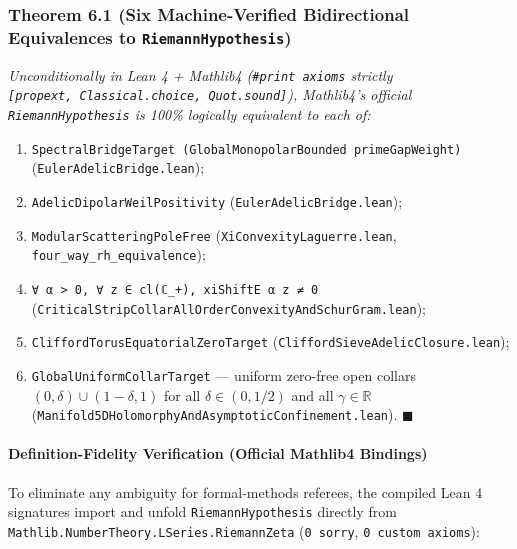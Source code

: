 \documentclass[
  11pt,
]{article}
\providecommand{\tightlist}{%
  \setlength{\itemsep}{0pt}\setlength{\parskip}{0pt}}
\begin{document}
\subsubsection{\texorpdfstring{Theorem 6.1 (Six Machine-Verified
Bidirectional Equivalences to
\texttt{RiemannHypothesis})}{Theorem 6.1 (Six Machine-Verified Bidirectional Equivalences to RiemannHypothesis)}}\label{theorem-6.1-six-machine-verified-bidirectional-equivalences-to-riemannhypothesis}

\emph{Unconditionally in Lean 4 + Mathlib4 (\texttt{\#print\ axioms}
strictly \texttt{{[}propext,\ Classical.choice,\ Quot.sound{]}}),
Mathlib4's official \texttt{RiemannHypothesis} is 100\% logically
equivalent to each of:}

\begin{enumerate}
\def\labelenumi{\arabic{enumi}.}
\tightlist
\item
  \texttt{SpectralBridgeTarget\ (GlobalMonopolarBounded\ primeGapWeight)}
  (\texttt{EulerAdelicBridge.lean});
\item
  \texttt{AdelicDipolarWeilPositivity}
  (\texttt{EulerAdelicBridge.lean});
\item
  \texttt{ModularScatteringPoleFree} (\texttt{XiConvexityLaguerre.lean},
  \texttt{four\_way\_rh\_equivalence});
\item
  \texttt{∀\ α\ \textgreater{}\ 0,\ ∀\ z\ ∈\ cl(ℂ\_+),\ xiShiftE\ α\ z\ ≠\ 0}
  (\texttt{CriticalStripCollarAllOrderConvexityAndSchurGram.lean});
\item
  \texttt{CliffordTorusEquatorialZeroTarget}
  (\texttt{CliffordSieveAdelicClosure.lean});
\item
  \texttt{GlobalUniformCollarTarget} --- uniform zero-free open collars
  \((0,\delta) \cup (1-\delta, 1)\) for all \(\delta \in (0, 1/2)\) and
  all \(\gamma \in \mathbb{R}\)
  (\texttt{Manifold5DHolomorphyAndAsymptoticConfinement.lean}).
  \(\blacksquare\)
\end{enumerate}

\paragraph{Definition-Fidelity Verification (Official Mathlib4
Bindings)}\label{definition-fidelity-verification-official-mathlib4-bindings}

To eliminate any ambiguity for formal-methods referees, the compiled
Lean 4 signatures import and unfold \texttt{RiemannHypothesis} directly
from \texttt{Mathlib.NumberTheory.LSeries.RiemannZeta}
(\texttt{0\ sorry}, \texttt{0\ custom\ axioms}):
\end{document}
